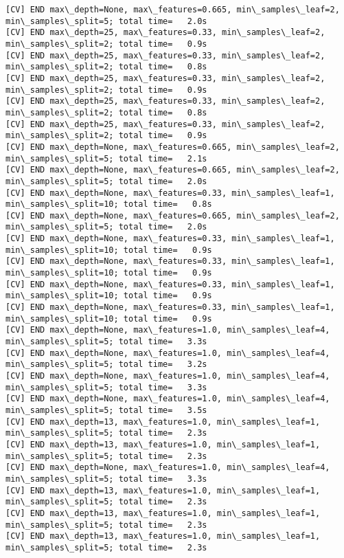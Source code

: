 \documentclass[11pt]{article}
\begin{document}
\begin{Verbatim}[commandchars=\\\{\}]
[CV] END max\_depth=None, max\_features=0.665, min\_samples\_leaf=2,
min\_samples\_split=5; total time=   2.0s
[CV] END max\_depth=25, max\_features=0.33, min\_samples\_leaf=2,
min\_samples\_split=2; total time=   0.9s
[CV] END max\_depth=25, max\_features=0.33, min\_samples\_leaf=2,
min\_samples\_split=2; total time=   0.8s
[CV] END max\_depth=25, max\_features=0.33, min\_samples\_leaf=2,
min\_samples\_split=2; total time=   0.9s
[CV] END max\_depth=25, max\_features=0.33, min\_samples\_leaf=2,
min\_samples\_split=2; total time=   0.8s
[CV] END max\_depth=25, max\_features=0.33, min\_samples\_leaf=2,
min\_samples\_split=2; total time=   0.9s
[CV] END max\_depth=None, max\_features=0.665, min\_samples\_leaf=2,
min\_samples\_split=5; total time=   2.1s
[CV] END max\_depth=None, max\_features=0.665, min\_samples\_leaf=2,
min\_samples\_split=5; total time=   2.0s
[CV] END max\_depth=None, max\_features=0.33, min\_samples\_leaf=1,
min\_samples\_split=10; total time=   0.8s
[CV] END max\_depth=None, max\_features=0.665, min\_samples\_leaf=2,
min\_samples\_split=5; total time=   2.0s
[CV] END max\_depth=None, max\_features=0.33, min\_samples\_leaf=1,
min\_samples\_split=10; total time=   0.9s
[CV] END max\_depth=None, max\_features=0.33, min\_samples\_leaf=1,
min\_samples\_split=10; total time=   0.9s
[CV] END max\_depth=None, max\_features=0.33, min\_samples\_leaf=1,
min\_samples\_split=10; total time=   0.9s
[CV] END max\_depth=None, max\_features=0.33, min\_samples\_leaf=1,
min\_samples\_split=10; total time=   0.9s
[CV] END max\_depth=None, max\_features=1.0, min\_samples\_leaf=4,
min\_samples\_split=5; total time=   3.3s
[CV] END max\_depth=None, max\_features=1.0, min\_samples\_leaf=4,
min\_samples\_split=5; total time=   3.2s
[CV] END max\_depth=None, max\_features=1.0, min\_samples\_leaf=4,
min\_samples\_split=5; total time=   3.3s
[CV] END max\_depth=None, max\_features=1.0, min\_samples\_leaf=4,
min\_samples\_split=5; total time=   3.5s
[CV] END max\_depth=13, max\_features=1.0, min\_samples\_leaf=1,
min\_samples\_split=5; total time=   2.3s
[CV] END max\_depth=13, max\_features=1.0, min\_samples\_leaf=1,
min\_samples\_split=5; total time=   2.3s
[CV] END max\_depth=None, max\_features=1.0, min\_samples\_leaf=4,
min\_samples\_split=5; total time=   3.3s
[CV] END max\_depth=13, max\_features=1.0, min\_samples\_leaf=1,
min\_samples\_split=5; total time=   2.3s
[CV] END max\_depth=13, max\_features=1.0, min\_samples\_leaf=1,
min\_samples\_split=5; total time=   2.3s
[CV] END max\_depth=13, max\_features=1.0, min\_samples\_leaf=1,
min\_samples\_split=5; total time=   2.3s

\end{Verbatim}
\end{document}
